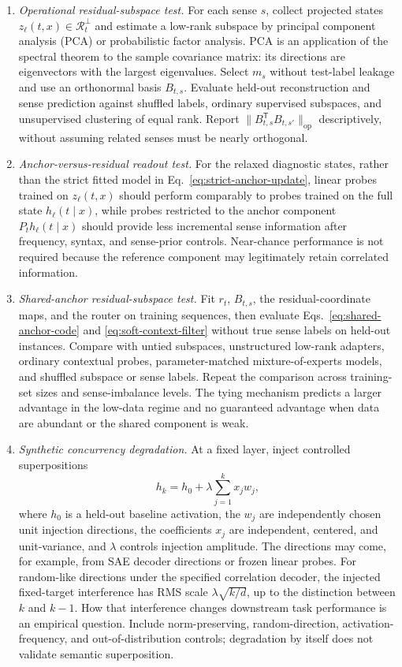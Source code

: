 \documentclass[
  aps,
  reprint,
  superscriptaddress,
  floatfix,
  nofootinbib,
  longbibliography
]{revtex4-2}
\newcommand{\T}{^{\mathsf{T}}}
\newcommand{\opnorm}[1]{\lVert #1 \rVert_{\mathrm{op}}}
\begin{document}
\begin{enumerate}
\item \emph{Operational residual-subspace test.}
For each sense $s$, collect projected states
$z_\ell(t,x)\in\mathcal R_t^\perp$ and estimate a low-rank subspace by
principal component analysis (PCA) or probabilistic factor analysis.  PCA is
an application of the spectral theorem to the sample covariance matrix: its
directions are eigenvectors with the largest eigenvalues.  Select $m_s$
without test-label leakage and use
an orthonormal basis $B_{t,s}$.  Evaluate held-out reconstruction and sense
prediction against shuffled labels, ordinary supervised subspaces, and
unsupervised clustering of equal rank.  Report
$\opnorm{B_{t,s}\T B_{t,s'}}$ descriptively, without assuming related senses
must be nearly orthogonal.

\item \emph{Anchor-versus-residual readout test.}
For the relaxed diagnostic states, rather than the strict fitted model in
Eq.~\eqref{eq:strict-anchor-update}, linear probes trained on
$z_\ell(t,x)$ should perform comparably to
probes trained on the full state $h_\ell(t\mid x)$, while probes
restricted to the anchor component $P_t h_\ell(t\mid x)$ should provide
less incremental sense information after frequency, syntax, and sense-prior
controls.  Near-chance performance is not required because the reference
component may legitimately retain correlated information.

\item \emph{Shared-anchor residual-subspace test.}
Fit $r_t$, $B_{t,s}$, the residual-coordinate maps, and the router on training
sequences, then evaluate Eqs.~\eqref{eq:shared-anchor-code} and
\eqref{eq:soft-context-filter} without true sense labels on held-out instances.
Compare with untied subspaces, unstructured low-rank adapters, ordinary contextual
probes, parameter-matched mixture-of-experts models, and shuffled subspace or
sense labels.
Repeat the comparison across training-set sizes and sense-imbalance levels.
The tying mechanism predicts a larger advantage in the low-data regime and no
guaranteed advantage when data are abundant or the shared component is weak.

\item \emph{Synthetic concurrency degradation.}
At a fixed layer, inject controlled superpositions
%
\begin{equation}
h_k=h_0+\lambda\sum_{j=1}^k x_j w_j,
\end{equation}
%
where $h_0$ is a held-out baseline activation, the $w_j$ are independently
chosen unit injection directions, the coefficients $x_j$ are independent,
centered, and unit-variance, and $\lambda$ controls injection amplitude.  The
directions may come, for example, from SAE decoder directions or frozen linear
probes.  For random-like directions under the specified correlation decoder,
the injected fixed-target interference has RMS scale
$\lambda\sqrt{k/d}$, up to the distinction between $k$ and $k-1$.
How that interference changes downstream task performance is an empirical
question.  Include norm-preserving, random-direction, activation-frequency,
and out-of-distribution controls; degradation by itself does not validate
semantic superposition.


\end{enumerate}
\end{document}
